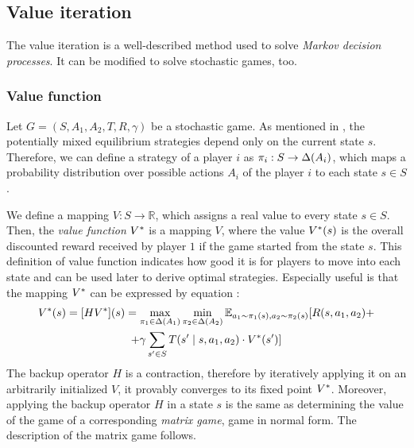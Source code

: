 \documentclass[../main.tex]{subfiles}
\begin{document}
\subsection{Value iteration}\label{standard:sg:valueiter}
The value iteration is a well-described method used to solve \textit{Markov decision processes}.
It can be modified to solve stochastic games, too.

\subsubsection{Value function}\label{standard:sg:valueiter:valuefun}
Let $G = (S, A_1, A_2, T, R, \gamma)$ be a stochastic game.
As mentioned in , the potentially mixed equilibrium strategies depend only on the current state $s$.
Therefore, we can define a strategy of a player $i$ as $\pi_{i}: S \to \Delta(A_i)$, which maps a probability distribution over possible actions $A_i$ of the player $i$ to each state $s \in S$.

We define a mapping $V: S \to \mathbb{R}$, which assigns a real value to every state $s \in S$.
Then, the \textit{value function} $V^*$ is a mapping $V$, where the value $V^*(s)$ is the overall discounted reward received by player $1$ if the game started from the state $s$.
This definition of value function indicates how good it is for players to move into each state and can be used later to derive optimal strategies.
Especially useful is that the mapping $V^*$ can be expressed by equation \cite{poposgsthesis}:
\begin{multline}
    V^*(s) = [HV^*](s) = \max_{\pi_{1} \in \Delta(A_1)} \min_{\pi_{2} \in \Delta(A_2)} \mathbb{E}_{a_1 \sim \pi_{1}(s), a_2 \sim \pi_{2}(s)} [R(s, a_1, a_2) + \\
    + \gamma\sum_{s^{\prime} \in S} T(s^{\prime} \mid s, a_1, a_2)\cdot V^*(s^{\prime})]
\end{multline}
The backup operator $H$ is a contraction, therefore by iteratively applying it on an arbitrarily initialized $V$, it provably converges to its fixed point $V^*$\cite{shapley}.
Moreover, applying the backup operator $H$ in a state $s$ is the same as determining the value of the game of a corresponding \textit{matrix game}, game in normal form.
The description of the matrix game follows.
\end{document}
